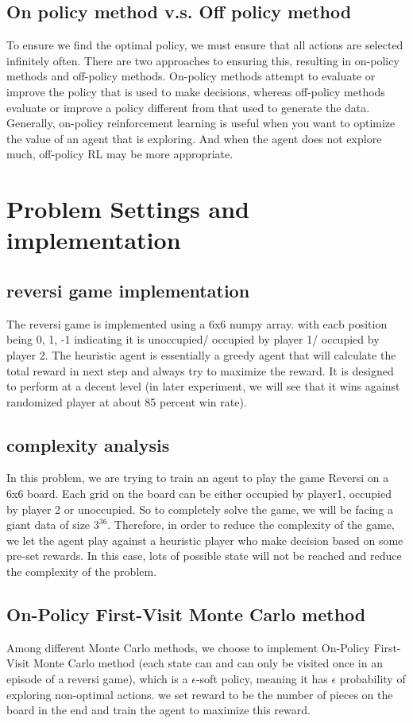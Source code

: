 \documentclass[12pt]{article}
\begin{document}
\subsection{On policy method v.s. Off policy method}
To ensure we find the optimal policy, we must ensure that all actions are selected infinitely often. There are two approaches to ensuring this, resulting in on-policy methods and off-policy methods. On-policy methods attempt to evaluate or improve the policy that is used to make decisions, whereas off-policy methods evaluate or improve a policy different from that used to generate the data. Generally, on-policy reinforcement learning is useful when you want to optimize the value of an agent that is exploring. And when the agent does not explore much, off-policy RL may be more appropriate.

\section{Problem Settings and implementation}
\subsection{reversi game implementation}
The reversi game is implemented using a 6x6 numpy array. with eacb position being 0, 1, -1 indicating it is unoccupied/ occupied by player 1/ occupied by player 2. The heuristic agent is essentially a greedy agent that will calculate the total reward in next step and always try to maximize the reward. It is designed to perform at a decent level (in later experiment, we will see that it wins against randomized player at about 85 percent win rate).

\subsection{complexity analysis}
In this problem, we are trying to train an agent to play the game Reversi on a 6x6 board. Each grid on the board can be either occupied by player1, occupied by player 2 or unoccupied. So to completely solve the game, we will be facing a giant data of size $3^36$. Therefore, in order to reduce the complexity of the game, we let the agent play against a heuristic player who make decision based on some pre-set rewards. In this case, lots of possible state will not be reached and reduce the complexity of the problem.

\subsection{On-Policy First-Visit Monte Carlo method}
Among different Monte Carlo methods, we choose to implement On-Policy First-Visit Monte Carlo method (each state can and can only be visited once in an episode of a reversi game), which is a $\epsilon $-soft policy, meaning it has $\epsilon$ probability of exploring non-optimal actions. we set reward to be the number of pieces on the board in the end and train the agent to maximize this reward.
\end{document}
